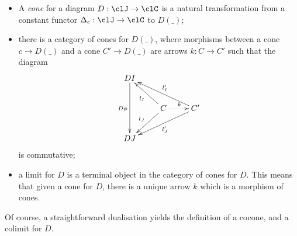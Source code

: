 \documentclass[11pt]{article}
\begin{document}
\begin{itemize}
	\item A \emph{cone} for a diagram $D : \clJ \to \clC$ is a natural transformation from a constant functor $\Delta_c : \clJ \to \clC$ to $D(\_)$;
	\item there is a category of cones for $D(\_)$, where morphisms between a cone $c\to D(\_)$ and a cone $C'\to D(\_)$ are arrows $k : C\to C'$ such that the diagram
	      \[
		      \vcenter{\xymatrix{
				      DI \ar[dd]_{D\phi}&& \\
				      &C\ar@{.>}[r]^k \ar[ul]^{l_I}\ar[dl]_{l_J}& C' \ar[ull]_{l_I'}\ar[dll]^{l_J'}\\
				      DJ
			      }}
	      \]
	      is commutative;
	\item a limit for $D$ is a terminal object in the category of cones for $D$. This means that given a cone for $D$, there is a unique arrow $k$ which is a morphism of cones.
\end{itemize}
Of course, a straightforward dualisation yields the definition of a cocone, and a colimit for $D$.
\end{document}
